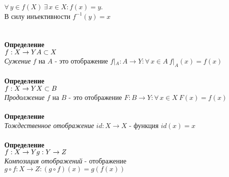 \documentclass[12pt]{article}
\begin{document}
$\forall\,y \in f(X)\ \exists\,x\in X: f(x)=y$.\\
В силу инъективности $f^{-1}(y)=x$\\\\\\
\textbf{Определение}\\
$f:X\rightarrow Y\\
A \subset X$\\
\textit{Сужение} $f$ на $A$ - это отображение $f|_A: A \rightarrow Y: \forall\,x\in A\ f|_A(x)=f(x)$\\\\
\textbf{Определение}\\
$f:X\rightarrow Y\\
X \subset B$\\
\textit{Продолжение} $f$ на $B$ - это отображение $F: B \rightarrow Y: \forall\,x\in X\ F(x)=f(x)$\\\\
\textbf{Определение}\\
\textit{Тождественное отображение} $id:X\rightarrow X$ - функция $id(x)=x$\\\\
\textbf{Определение}\\
$f:X\rightarrow Y\\
g:Y\rightarrow Z$\\
\textit{Композиция отображений} - отображение $g\circ f: X \rightarrow Z: (g\circ f)(x)=g(f(x))$\\
\end{document}
